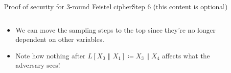 \documentclass[aspectratio=169, lualatex, handout]{beamer}
\begin{document}
	\begin{frame}{Proof of security for 3-round Feistel cipher}{Step 6 (this content is optional)}
		\begin{columns}[c]
			\begin{column}{0.5\textwidth}
				\begin{itemize}
					\item We can move the sampling steps to the top since they're no longer dependent on other variables.
					\item Note how nothing after $L[X_0\|X_1] \coloneq X_3\|X_4$ affects what the adversary sees!
				\end{itemize}
			\end{column}
			\begin{column}{0.5\textwidth}
				\vspace{-1.5cm}
				\begin{center}
				\end{center}
			\end{column}
		\end{columns}
	\end{frame}
\end{document}
